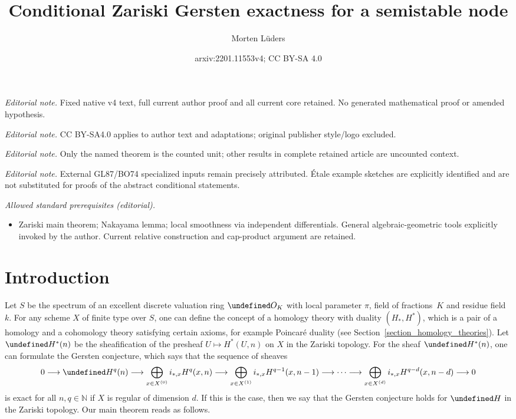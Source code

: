\documentclass[10pt,a4paper]{article}
\title{Conditional Zariski Gersten exactness for a semistable node}
\author{Morten Lüders}
\date{arxiv:2201.11553v4; CC BY-SA 4.0}
\let\cal\undefined
\numberwithin{equation}{section}
\newtheorem{Key lemma}[theorem]{Key lemma}
\theoremstyle{definition}
\theoremstyle{remark}
\newcommand{\bb}{\mathbb}
\newcommand{\To}{\longrightarrow}
\newcommand{\cal}{\mathcal}
\begin{document}
\maketitle
\noindent\textit{Editorial note.} Fixed native v4 text, full current author proof and all current core retained. No generated mathematical proof or amended hypothesis.\par\medskip
\noindent\textit{Editorial note.} CC BY-SA4.0 applies to author text and adaptations; original publisher style/logo excluded.\par\medskip
\noindent\textit{Editorial note.} Only the named theorem is the counted unit; other results in complete retained article are uncounted context.\par\medskip
\noindent\textit{Editorial note.} External GL87/BO74 specialized inputs remain precisely attributed. Étale example sketches are explicitly identified and are not substituted for proofs of the abstract conditional statements.\par\medskip
\noindent\textit{Allowed standard prerequisites (editorial).}\begin{itemize}
\item Zariski main theorem; Nakayama lemma; local smoothness via independent differentials. General algebraic-geometric tools explicitly invoked by the author. Current relative construction and cap-product argument are retained.
\end{itemize}\medskip
\section{Introduction}
Let $S$ be the spectrum of an excellent discrete valuation ring $\cal O_K$ with local parameter $\pi$, field of fractions~$K$ and residue field $k$. 
For any scheme $X$ of finite type over $S$, one can define the concept of a homology theory with duality $(H_*,H^*)$, which is a pair of a homology and a cohomology theory satisfying certain axioms, for example Poincar\'e duality (see Section~\ref{section_homology_theories}). Let $\cal H^*(n)$ be the sheafification of the presheaf $U\mapsto H^*(U,n)$ on $X$ in the Zariski topology. For the sheaf $\cal H^*(n)$, one can formulate the Gersten conjecture, which says that the sequence of sheaves
\[0\To \cal H^q(n) \To \bigoplus_{x\in X^{(0)}}i_{*,x}H^{q}(x,n)\To \bigoplus_{x\in X^{(1)}}i_{*,x}H^{q-1}(x,n-1)\To\cdots\To \bigoplus_{x\in X^{(d)}}i_{*,x}H^{q-d}(x,n-d)\To 0 \]
is exact for all $n,q \in \bb N$ if $X$ is regular of dimension $d$. If this is the case, then we say that the Gersten conjecture holds for $\cal H$ in the Zariski topology.
Our main theorem reads as follows. 
\end{document}
